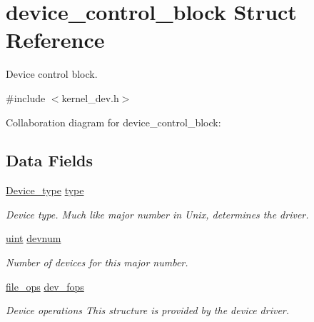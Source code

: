 \hypertarget{structdevice__control__block}{}\section{device\+\_\+control\+\_\+block Struct Reference}
\label{structdevice__control__block}


Device control block.  




{\ttfamily \#include $<$kernel\+\_\+dev.\+h$>$}



Collaboration diagram for device\+\_\+control\+\_\+block\+:
\subsection*{Data Fields}
\begin{DoxyCompactItemize}
\item 
\mbox{\label{structdevice__control__block_a35a45268132777177a33513c747633c4}} 
\hyperlink{group__dev_ga879ceac20e83b2375e5b49f4379b0c90}{Device\+\_\+type} \hyperlink{structdevice__control__block_a35a45268132777177a33513c747633c4}{type}
\begin{DoxyCompactList}\small\item\em Device type. Much like \textquotesingle{}major number\textquotesingle{} in Unix, determines the driver. \end{DoxyCompactList}\item 
\mbox{\label{structdevice__control__block_a25d8f038a1c6d41f445d078276117fba}} 
\hyperlink{bios_8h_a91ad9478d81a7aaf2593e8d9c3d06a14}{uint} \hyperlink{structdevice__control__block_a25d8f038a1c6d41f445d078276117fba}{devnum}
\begin{DoxyCompactList}\small\item\em Number of devices for this major number. \end{DoxyCompactList}\item 
\mbox{\label{structdevice__control__block_a2945d5da96f40ff7fae94e295624a7c7}} 
\hyperlink{group__dev_gaab625d8ae3a95e942ed10ed1579f5042}{file\+\_\+ops} \hyperlink{structdevice__control__block_a2945d5da96f40ff7fae94e295624a7c7}{dev\+\_\+fops}
\begin{DoxyCompactList}\small\item\em Device operations This structure is provided by the device driver. \end{DoxyCompactList}\end{DoxyCompactItemize}


